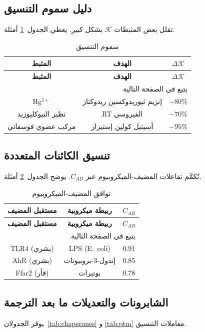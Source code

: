 \documentclass[11pt,a4paper]{article}
\newcommand{\REL}{\mathcal{K}}
\begin{document}
	\subsection{دليل سموم التنسيق}
	تقلل بعض المثبطات \(\REL\) بشكل كبير. يعطي الجدول~\ref{tab:poisons} أمثلة.
	
	\begin{longtable}{|c|c|c|}
		\caption{سموم التنسيق}\label{tab:poisons}\\
		\hline
		\textbf{المثبط} & \textbf{الهدف} & \(\Delta \REL\) \\
		\hline
		\endfirsthead
		\hline
		\textbf{المثبط} & \textbf{الهدف} & \(\Delta \REL\) \\
		\hline
		\endhead
		\hline
		\multicolumn{3}{r}{يتبع في الصفحة التالية}\\
		\endfoot
		\hline
		\endlastfoot
		Hg\(^{2+}\) & إنزيم ثيوريدوكسين ريدوكتاز & \(-80\%\) \\
		نظير النيوكليوزيد & RT الفيروسي & \(-70\%\) \\
		مركب عضوي فوسفاتي & أسيتيل كولين إستيراز & \(-95\%\) \\
		\hline
	\end{longtable}
	
	\subsection{تنسيق الكائنات المتعددة}
	تُكمَّم تفاعلات المضيف-الميكروبيوم عبر \(C_{AB}\). يوضح الجدول~\ref{tab:microbiome} أمثلة.
	
	\begin{longtable}{|c|c|c|}
		\caption{توافق المضيف-الميكروبيوم}\label{tab:microbiome}\\
		\hline
		\textbf{مستقبل المضيف} & \textbf{ربيطة ميكروبية} & \(C_{AB}\) \\
		\hline
		\endfirsthead
		\hline
		\textbf{مستقبل المضيف} & \textbf{ربيطة ميكروبية} & \(C_{AB}\) \\
		\hline
		\endhead
		\hline
		\multicolumn{3}{r}{يتبع في الصفحة التالية}\\
		\endfoot
		\hline
		\endlastfoot
		TLR4 (بشري) & LPS (E.\ coli) & 0.91 \\
		AhR (بشري) & إندول-3-بروبيونات & 0.85 \\
		Ffar2 (فأر) & بوتيرات & 0.78 \\
		\hline
	\end{longtable}
	
	\subsection{الشابرونات والتعديلات ما بعد الترجمة}
	يوفر الجدولان~\ref{tab:chaperones} و \ref{tab:ptm} معاملات التنسيق.
	
\end{document}
